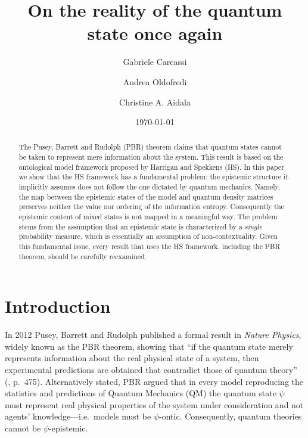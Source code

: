 \documentclass[twocolumn,prl,floatfix,superscriptaddress]{revtex4-2}
\begin{document}
\title{On the reality of the quantum state once again}
\author{Gabriele Carcassi}
\author{Andrea Oldofredi}
\author{Christine A. Aidala}
\vspace{2mm}

\date{\today}


\begin{abstract}
The Pusey, Barrett and Rudolph (PBR) theorem claims that quantum states cannot be taken to represent mere information about the system. This result is based on the ontological model framework proposed by Harrigan and Spekkens (HS). In this paper we show that the HS framework has a fundamental problem: the epistemic structure it implicitly assumes does not follow the one dictated by quantum mechanics. Namely, the map between the epistemic states of the model and quantum density matrices preserves neither the value nor ordering of the information entropy. Consequently the epistemic content of mixed states is not mapped in a meaningful way. The problem stems from the assumption that an epistemic state is characterized by a \emph{single} probability measure, which is essentially an assumption of non-contextuality. Given this fundamental issue, every result that uses the HS framework, including the PBR theorem, should be carefully reexamined.
\end{abstract}

\maketitle

\section{Introduction}
 
In 2012 Pusey, Barrett and Rudolph published a formal result in \emph{Nature Physics}, widely known as the PBR theorem, showing that ``if the quantum state merely represents information about the real physical state of a system, then experimental predictions are obtained that contradict those of quantum theory'' (\cite{PBR:2012}, p.\ 475). Alternatively stated, PBR argued that in every model reproducing the statistics and predictions of Quantum Mechanics (QM) the quantum state $\psi$ must represent real physical properties of the system under consideration and not agents' knowledge---i.e.\ models must be $\psi$-ontic. Consequently, quantum theories cannot be $\psi$-epistemic. 
\end{document}
